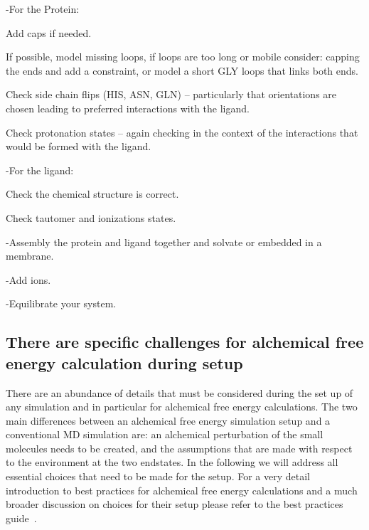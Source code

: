 \documentclass[9pt,bestpractices]{livecoms}
\begin{document}
-For the Protein: 

	Add caps if needed.
    
	If possible, model missing loops, if loops are too long or mobile consider: capping the ends and add a constraint, or model a short GLY loops that links both ends.
    
	Check side chain flips (HIS, ASN, GLN) – particularly that orientations are chosen leading to preferred interactions with the ligand.
    
	Check protonation states – again checking in the context of the interactions that would be formed with the ligand.
    
-For the ligand:

	Check the chemical structure is correct.
  
	Check tautomer and ionizations states.
    
-Assembly the protein and ligand together and solvate or embedded in a membrane. 

-Add ions.

-Equilibrate your system. 


\subsection{There are specific challenges for alchemical free energy calculation during setup}
\label{sec:alchemical_prep}

There are an abundance of details that must be considered during the set up of any simulation and in particular for alchemical free energy calculations. The two main differences between an alchemical free energy simulation setup and a conventional MD simulation are: an alchemical perturbation of the small molecules needs to be created, and the assumptions that are made with respect to the environment at the two endstates. In the following we will address all essential choices that need to be made for the setup. For a very detail introduction to best practices for alchemical free energy calculations and a much broader discussion on choices for their setup please refer to the best practices guide~\cite{meyBestPracticesAlchemical2020}. 
\end{document}
